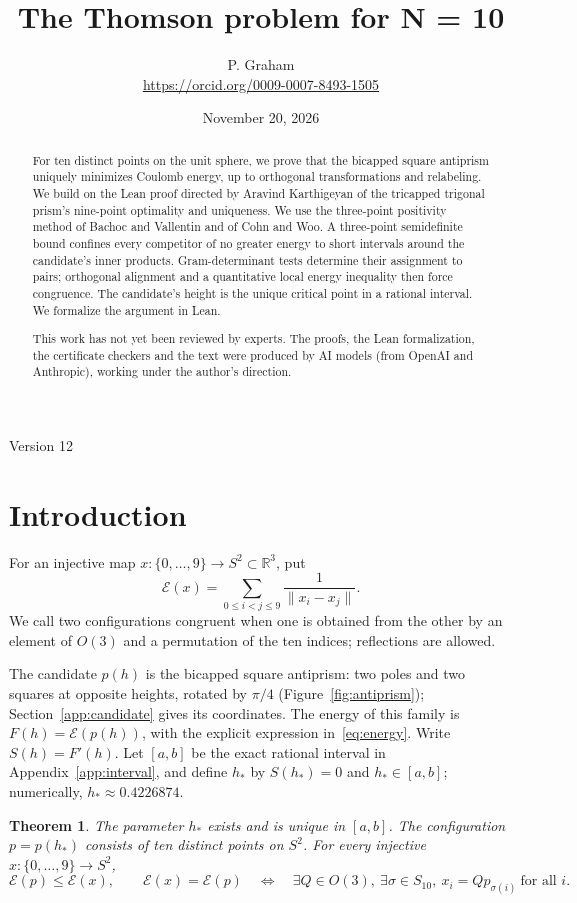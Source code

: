 \documentclass[11pt]{article}
\title{The Thomson problem for N = 10}
\author{P. Graham\\ \small\url{https://orcid.org/0009-0007-8493-1505}}
\date{November 20, 2026}
\newtheorem{theorem}{Theorem}
\newcommand{\R}{\mathbb{R}}
\newcommand{\E}{\mathcal{E}}
\begin{document}
\maketitle
\begin{center}Version 12\end{center}
\begin{abstract}
For ten distinct points on the unit sphere, we prove that the bicapped
square antiprism uniquely minimizes Coulomb energy, up to orthogonal
transformations and relabeling.
We build on the Lean proof directed by Aravind Karthigeyan of the
tricapped trigonal prism's nine-point optimality and uniqueness.
We use the three-point positivity method of Bachoc and Vallentin and of
Cohn and Woo. A three-point semidefinite bound confines every competitor of
no greater energy to short intervals around the candidate's inner
products. Gram-determinant tests determine their assignment to pairs;
orthogonal alignment and a quantitative local energy inequality
then force congruence. The candidate's height is the unique critical point
in a rational interval. We formalize the argument in Lean.

This work has not yet been reviewed by experts.
The proofs, the Lean formalization, the certificate checkers and the text
were produced by AI models (from OpenAI and Anthropic), working under the
author's direction.
\end{abstract}

\section{Introduction}\label{sec:candidate}
For an injective map $x:\{0,\ldots,9\}\to S^2\subset\R^3$, put
\[
  \E(x)=\sum_{0\leq i<j\leq9}\frac1{\|x_i-x_j\|}.
\]
We call two configurations congruent when one is obtained from the other
by an element of $O(3)$ and a permutation of the ten indices; reflections
are allowed.

The candidate $p(h)$ is the bicapped square antiprism: two poles and two
squares at opposite heights, rotated by $\pi/4$
(Figure~\ref{fig:antiprism}); Section~\ref{app:candidate} gives its coordinates.
The energy of this family is $F(h)=\E(p(h))$, with the explicit expression
in~\eqref{eq:energy}. Write $S(h)=F'(h)$. Let $[a,b]$ be the exact
rational interval in Appendix~\ref{app:interval}, and define $h_*$ by
$S(h_*)=0$ and $h_*\in[a,b]$; numerically, $h_*\approx0.4226874$.

\begin{theorem}\label{thm:main}
The parameter $h_*$ exists and is unique in $[a,b]$. The configuration
$p=p(h_*)$ consists of ten distinct points on $S^2$. For every injective
$x:\{0,\ldots,9\}\to S^2$,
\[
 \E(p)\leq\E(x),\qquad
 \E(x)=\E(p)\quad\Longleftrightarrow\quad
 \exists Q\in O(3),\ \exists\sigma\in S_{10},\
 x_i=Qp_{\sigma(i)}\ \text{for all }i.
\]
\end{theorem}
\end{document}
